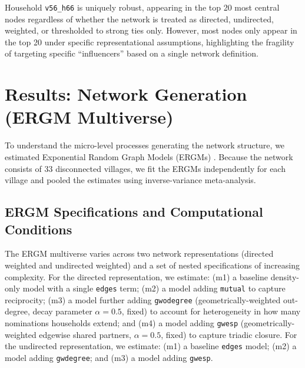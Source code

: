 \documentclass[11pt,a4paper]{article}
\begin{document}
Household \texttt{v56\_h66} is uniquely robust, appearing in the top 20 most central nodes regardless of whether the network is treated as directed, undirected, weighted, or thresholded to strong ties only. However, most nodes only appear in the top 20 under specific representational assumptions, highlighting the fragility of targeting specific ``influencers'' based on a single network definition.

\section{Results: Network Generation (ERGM Multiverse)}

To understand the micro-level processes generating the network structure, we estimated Exponential Random Graph Models (ERGMs) \citep{Lusher2013, Robins2015}. Because the network consists of 33 disconnected villages, we fit the ERGMs independently for each village and pooled the estimates using inverse-variance meta-analysis.

\subsection{ERGM Specifications and Computational Conditions}

The ERGM multiverse varies across two network representations (directed weighted and undirected weighted) and a set of nested specifications of increasing complexity. For the directed representation, we estimate: (m1) a baseline density-only model with a single \texttt{edges} term; (m2) a model adding \texttt{mutual} to capture reciprocity; (m3) a model further adding \texttt{gwodegree} (geometrically-weighted out-degree, decay parameter $\alpha = 0.5$, fixed) to account for heterogeneity in how many nominations households extend; and (m4) a model adding \texttt{gwesp} (geometrically-weighted edgewise shared partners, $\alpha = 0.5$, fixed) to capture triadic closure. For the undirected representation, we estimate: (m1) a baseline \texttt{edges} model; (m2) a model adding \texttt{gwdegree}; and (m3) a model adding \texttt{gwesp}.
\end{document}
